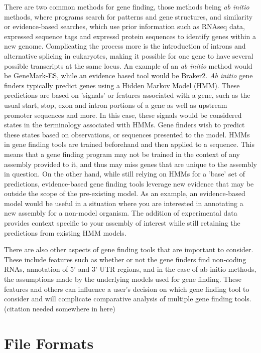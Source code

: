 There are two common methods for gene finding, those methods being
\textit{ab initio} methods, where programs search for patterns and
gene structures, and similarity or evidence-based searches, which use
prior information such as RNAseq data, expressed sequence tags and
expressd protein sequences to identify genes within a new
genome\cite{Ejigu2020}. Complicating the process more is the
introduction of introns and alternative splicing in eukaryotes, making
it possible for one gene to have several possible transcripts at the
same locus. An example of an \textit{ab initio} method would be
GeneMark-ES\cite{10.1093/nar/gki937}, while an evidence based tool
would be Braker2\cite{Bruna2021}.
\textit{Ab initio} gene finders typically predict genes using a Hidden
Markov Model (HMM)\cite{Ejigu2020}. These predictions are based on
'signals' or features associated with a gene, such as the usual start,
stop, exon and intron portions of a gene as well as upstream promoter
sequences and more. In this case, these signals would be considered
states in the terminology associated with HMMs. Gene finders wish to
predict these states based on observations, or sequences presented to
the model. HMMs in gene finding tools are trained beforehand and then
applied to a sequence. This means that a gene finding program may not
be trained in the context of any assembly provided to it, and thus may
miss genes that are unique to the assembly in question.
On the other hand, while still relying on HMMs for a 'base' set of
predictions, evidence-based gene finding tools leverage new evidence
that may be outside the scope of the pre-existing
model\cite{Keller2011}.  As an example, an evidence-based model would
be useful in a situation where you are interested in annotating a new
assembly for a non-model organism. The addition of experimental data
provides context specific to your assembly of interest while still
retaining the predictions from existing HMM models.

There are also other aspects of gene finding tools that are important
to consider. These include features such as whether or not the gene
finders find non-coding RNAs, annotation of 5' and 3' UTR regions, and
in the case of ab-initio methods, the assumptions made by the
underlying models used for gene finding. These features and others can
influence a user's decision on which gene finding tool to consider and
will complicate comparative analysis of multiple gene finding
tools. (citation needed somewhere in here)

\section{File Formats}

